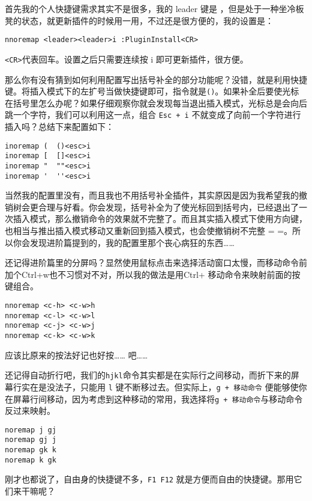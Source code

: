 {首先我的个人快捷键需求其实不是很多，我的 leader 键是 ，但是处于一种坐冷板凳的状态，就更新插件的时候用一用，不过还是很方便的，我的设置是：

\begin{verbatim}
nnoremap <leader><leader>i :PluginInstall<CR>
\end{verbatim}

\texttt{<CR>}代表回车。设置之后只需要连续按 \texttt{}i 即可更新插件，很方便。

那么你有没有猜到如何利用配置写出括号补全的部分功能呢？没错，就是利用快捷键。将插入模式下的左扩号当做快捷键即可，指令就是\texttt{()}。如果补全后要使光标在括号里怎么办呢？如果仔细观察你就会发现每当退出插入模式，光标总是会向后跳一个字符，我们可以利用这一点，组合 \texttt{Esc + i} 不就变成了向前一个字符进行插入吗？总结下来配置如下：

\begin{verbatim}
inoremap (  ()<esc>i
inoremap [  []<esc>i
inoremap "  ""<esc>i
inoremap '  ''<esc>i
\end{verbatim}

当然我的配置里没有，而且我也不用括号补全插件，其实原因是因为我希望我的撤销树会更合理与好看。你会发现，括号补全为了使光标回到括号内，已经退出了一次插入模式，那么撤销命令的效果就不完整了。而且其实插入模式下使用方向键，也相当与推出插入模式移动又重新回到插入模式，也会使撤销树不完整 = =。所以你会发现进阶篇提到的，我的配置里那个丧心病狂的东西……

还记得进阶篇里的分屏吗？显然使用鼠标点击来选择活动窗口太慢，而移动命令前加个Ctrl+w也不习惯对不对，所以我的做法是用Ctrl+ 移动命令来映射前面的按键组合。

\begin{verbatim}
nnoremap <c-h> <c-w>h  
nnoremap <c-l> <c-w>l  
nnoremap <c-j> <c-w>j  
nnoremap <c-k> <c-w>k
\end{verbatim}

应该比原来的按法好记也好按…… 吧……

还记得自动折行吧，我们的\texttt{hjkl}命令其实都是在实际行之间移动，而折下来的屏幕行实在是没法子，只能用 \texttt{l} 键不断移过去。但实际上，\texttt{g + 移动命令} 便能够使你在屏幕行间移动，因为考虑到这种移动的常用，我选择将\texttt{g + 移动命令}与移动命令反过来映射。

\begin{verbatim}
noremap j gj
noremap gj j
noremap gk k
noremap k gk
\end{verbatim}

刚才也都说了，自由身的快捷键不多，\texttt{F1~F12} 就是方便而自由的快捷键。那用它们来干嘛呢？

}
